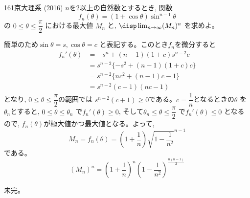 \begin{prob}{161}{\maru}{京大理系 (2016)}
 $n$を2以上の自然数とするとき, 関数
\[f_n(\theta )= (1+\cos{\theta})\sin^{n-1}{\theta}\]
の $0\leq \theta\leq \dfrac{\pi}{2}$ における最大値 $M_n$ と, $\disp\lim_{n\to \infty} (M_n)^n$ を求めよ。
\end{prob}
簡単のため$\sin{\theta}=s, \cos{\theta}=c$ と表記する。このとき$f_n$を微分すると
\begin{align*}
 f_n'(\theta)&= -s^n + (n-1)(1+c)s^{n-2}c\\
 &=s^{n-2}\{-s^2 +(n-1)(1+c)c\}\\
 &=s^{n-2}\{nc^2 +(n-1)c -1\}\\
 &=s^{n-2}(c+1)(nc-1)
\end{align*}
となり, $0\leq \theta\leq \dfrac{\pi}{2}$の範囲では $s^{n-2}(c+1)\geq 0$である。$c=\dfrac{1}{n}$となるときの$\theta$ を $\theta_n$とすると, $0\leq \theta\leq \theta_n$ で$f_n'(\theta)\geq 0$, そして$\theta_n\leq \theta\leq \dfrac{\pi}{2} $ で$f_n'(\theta)\leq 0$ となるので, $f_n(\theta)$が極大値かつ最大値となる。よって,
\[M_n=f_n(\theta)=\left(1+\dfrac{1}{n}\right)\sqrt{1-\dfrac{1}{n^2}}^{n-1}\]
である。
\[(M_n)^n=\left(1+\dfrac{1}{n}\right)^n\left(1-\dfrac{1}{n^2}\right)^{\frac{n(n-1)}{2}}\]

未完。